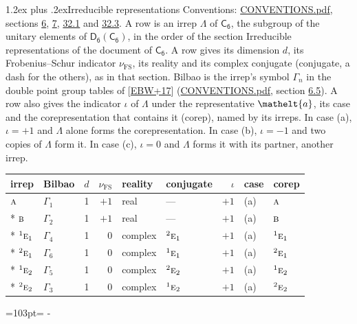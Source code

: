 \documentclass[10pt,a4paper]{article}
\makeatletter
\renewcommand\section{\@startsection{section}{1}{\z@}{-3ex plus -1ex minus -.2ex}%
  {1.2ex plus .2ex}{\normalfont\large\sffamily\bfseries\color{parttitle}}}
\newcommand{\needspace}[1]{\par\penalty-100\begingroup\dimen0=#1\relax\dimen2=\pagegoal
  \advance\dimen2-\pagetotal\ifdim\dimen0>\dimen2\relax\ifdim\dimen2>0pt\vfil\break\fi\fi
  \endgroup}
\numberwithin{equation}{section}
\newcommand{\eltfont}[1]{{\let\sigma\eltsigma\mathelt{#1}}}
\newcommand{\grp}[1]{\mathsf{#1}}
\newcommand{\irr}[1]{\text{\normalfont\scshape #1}}
\newcommand{\conjpair}[1]{{}^{#1}}
\newcommand{\elt}[1]{\eltfont{#1}}
\newcommand{\fsind}{\nu_{\mathrm{FS}}}
\makeatother
\begin{document}
\section{Irreducible representations}\label{s:irreps}
Conventions: \href{../../CONVENTIONS.pdf}{CONVENTIONS.pdf}, sections \href{../../../rotation/CONVENTIONS.pdf\#conv.6}{6}, \href{../../../rotation/CONVENTIONS.pdf\#conv.7}{7}, \href{../../CONVENTIONS.pdf\#conv.32.1}{32.1} and \href{../../CONVENTIONS.pdf\#conv.32.3}{32.3}.
\leavevmode\label{n:irrep.Delta}A row is an irrep $\Lambda$ of $\grp{C_{6}}$, the subgroup of the unitary elements of $\grp{D_{6}}(\grp{C_{6}})$, in the order of the section Irreducible representations of the document of \href{../../../rotation/data/pdf/C6.pdf}{$\grp{C_{6}}$}. \label{n:index.dimension}\label{n:index.frobenius}\label{n:head.irrep}\label{n:head.reality}\label{n:head.conjugate}A row gives its dimension $d$, its Frobenius--Schur indicator $\fsind$, its reality and its complex conjugate (conjugate, a dash for the others), as in that section. \label{n:head.bilbao}\label{n:irrep.alias.gamma}Bilbao is the irrep's symbol $\Gamma_n$ in the double point group tables of [\href{../../../REFERENCES.pdf\#ref.EBW+17}{EBW+17}] (\href{../../CONVENTIONS.pdf}{CONVENTIONS.pdf}, section \href{../../../rotation/CONVENTIONS.pdf\#conv.6.5}{6.5}). \label{n:head.case.corep}\label{n:head.corep}A row also gives the indicator $\iota$ of $\Lambda$ under the representative $\elt{a}$, its case and the corepresentation that contains it (corep), named by its irreps. In case (a), $\iota = +1$ and $\Lambda$ alone forms the corepresentation. In case (b), $\iota = -1$ and two copies of $\Lambda$ form it. In case (c), $\iota = 0$ and $\Lambda$ forms it with its partner, another irrep.
\setlength{\emergencystretch}{2em}\par\setlength{\emergencystretch}{0pt}
{\small\renewcommand{\arraystretch}{1.25}\setlength{\tabcolsep}{4pt}\begin{longtable}{@{}llrrllrll@{}}\toprule
irrep & Bilbao & $d$ & $\fsind$ & reality & conjugate & $\iota$ & case & corep\\\midrule\endhead
\bottomrule\endfoot\endlastfoot
$\irr{a}$ & $\Gamma_{1}$ & 1 & $+1$ & real & --- & $+1$ & (a) & $\irr{a}$\\*
$\irr{b}$ & $\Gamma_{2}$ & 1 & $+1$ & real & --- & $+1$ & (a) & $\irr{b}$\\*
$\conjpair{1}\irr{e}_{1}$ & $\Gamma_{4}$ & 1 & $0$ & complex & $\conjpair{2}\irr{e}_{1}$ & $+1$ & (a) & $\conjpair{1}\irr{e}_{1}$\\*
$\conjpair{2}\irr{e}_{1}$ & $\Gamma_{6}$ & 1 & $0$ & complex & $\conjpair{1}\irr{e}_{1}$ & $+1$ & (a) & $\conjpair{2}\irr{e}_{1}$\\*
$\conjpair{1}\irr{e}_{2}$ & $\Gamma_{5}$ & 1 & $0$ & complex & $\conjpair{2}\irr{e}_{2}$ & $+1$ & (a) & $\conjpair{1}\irr{e}_{2}$\\*
$\conjpair{2}\irr{e}_{2}$ & $\Gamma_{3}$ & 1 & $0$ & complex & $\conjpair{1}\irr{e}_{2}$ & $+1$ & (a) & $\conjpair{2}\irr{e}_{2}$\\
\bottomrule\end{longtable}}
\needspace{103pt}
\end{document}
